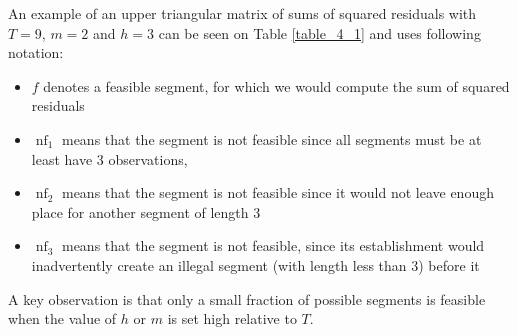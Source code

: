 \documentclass[main.tex]{subfiles}
\begin{document}
An example of an upper triangular matrix of sums of squared residuals with
$T=9$, $m=2$ and $h=3$ can be seen on Table \ref{table_4_1} and uses following
notation:
\begin{itemize}
\item $f$ denotes a feasible segment, for which we would compute the sum of squared
  residuals
\item $\operatorname{nf}_1$ means that the segment is not
feasible since all segments must be at least have 3 observations, 
\item $\operatorname{nf}_2$ means that the segment is not feasible since it would not
leave enough place for another segment of length 3
\item $\operatorname{nf}_3$ means
that the segment is not feasible, since its establishment would inadvertently
create an illegal segment (with length less than 3) before it
\end{itemize}
A key observation is that only a small fraction of possible segments is feasible when
the value of $h$ or $m$ is set high relative to $T$.
\end{document}
